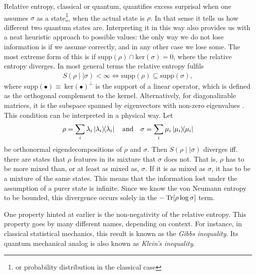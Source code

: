 Relative entropy, classical or quantum, quantifies excess surprisal when
one assumes $\sigma$ as a state\footnote{or probability distribution in the
classical case}, when the actual state is $\rho$. In that sense it tells us how
different two quantum states are. Interpreting it in this way also provides us
with a neat heuristic approach to possible values: the only way we do not lose
information is if we assume correctly, and in any other case we lose some. The
most extreme form of this is if $\mathrm{supp}(\rho)\cap\mathrm{ker}(\sigma)={0}$, where the
relative entropy diverges. In most general terms the relative entropy fulfils
\begin{align}\label{eq:inf-cond}
  S(\rho\mid\mid\sigma) < \infty \Longleftrightarrow \mathrm{supp}(\rho) \subseteq
  \mathrm{supp}(\sigma)
,\end{align}
where supp$(\bullet)\equiv\ $ker$(\bullet)^\perp$ is the support of a linear
operator, which is defined as the orthogonal complement to the kernel.
Alternatively, for diagonalizable matrices, it is the subspace spanned by
eigenvectors with non-zero eigenvalues
\cite{leditzkyRelativeEntropiesTheir2016,schumacherRelativeEntropyQuantum2000}.
This condition can be interpreted in a physical way. Let
\[
  \rho = \sum_i \lambda_i \dyad{\lambda_i} \quad{\text{and}} \quad
  \sigma = \sum_i \mu_i \dyad{\mu_i}
\]
be orthonormal eigendecompositions of $\rho$ and $\sigma$.
Then $S(\rho\mid\mid\sigma)$ diverges iff. there are states that $\rho$
features in its mixture that $\sigma$ does not. That is, $\rho$ has to be more
mixed than, or at least as mixed as, $\sigma$. If it is as mixed as
$\sigma$, it has to be a mixture of the same states. This means that the
information lost under the assumption of a purer state is infinite.
Since we know the von Neumann entropy to be bounded, this divergence occurs
solely in the $-\Tr[\rho\log\sigma]$ term. 

One property hinted at earlier is the non-negativity of the relative entropy.
This property goes by many different names, depending on context. For instance,
in classical statistical mechanics, this result is known as the \emph{Gibbs
inequality}. Its quantum mechanical analog is also known as \emph{Klein's
inequality}.

